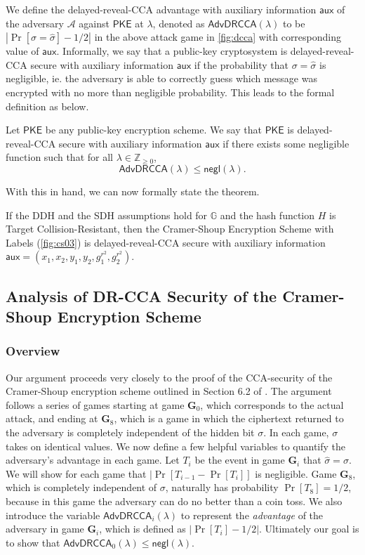 \documentclass[10pt,a4paper]{article}
\newcommand{\adv}{\mathcal{A}}
\newcommand{\PKE}{\mathsf{PKE}}
\newcommand{\negl}{\mathsf{negl}}
\newcommand{\aux}{\mathsf{aux}}
\newcommand{\drcca}{\mathsf{AdvDRCCA}}
\newcommand{\game}{\mathbf{G}}
\newcommand{\Z}{\mathbb{Z}}
\begin{document}
	We define the delayed-reveal-CCA advantage with auxiliary information $\aux$ of the adversary $\adv$ against $\PKE$ at $\lambda$, denoted as $\drcca(\lambda)$ to be $|\Pr[\sigma = \hat{\sigma}] - 1/2|$ in the above attack game in \cref{fig:dcca} with corresponding value of $\aux$. Informally, we say that a public-key cryptosystem is delayed-reveal-CCA secure with auxiliary information $\aux$ if the probability that $\sigma = \hat{\sigma}$ is negligible, ie. the adversary is able to correctly guess which message was encrypted with no more than negligible probability. This leads to the formal definition as below.
	
	\begin{definition}
		Let $\PKE$ be any public-key encryption scheme. We say that $\PKE$ is delayed-reveal-CCA secure with auxiliary information $\aux$ if there exists some negligible function such that for all $\lambda\in\Z_{\geq 0}$, $$\drcca(\lambda)\leq\negl(\lambda).$$
	\end{definition}

	With this in hand, we can now formally state the theorem.

	\begin{theorem}
		\label{thm:drcca-cs}
		If the DDH and the SDH assumptions hold for $\mathbb{G}$ and the hash function $H$ is Target Collision-Resistant, then the Cramer-Shoup Encryption Scheme with Labels (\cref{fig:cs03}) is delayed-reveal-CCA secure with auxiliary information $\aux = (x_1,x_2,y_1,y_2,g_1^{r^2},g_2^{r^2})$.
	\end{theorem}

	\subsection{Analysis of DR-CCA Security of the Cramer-Shoup Encryption Scheme}

	\subsubsection{Overview}

	Our argument proceeds very closely to the proof of the CCA-security of the Cramer-Shoup encryption scheme outlined in Section 6.2 of \cite{cs01}. The argument follows a series of games starting at game $\game_0$, which corresponds to the actual attack, and ending at $\game_8$, which is a game in which the ciphertext returned to the adversary is completely independent of the hidden bit $\sigma$. In each game, $\sigma$ takes on identical values. We now define a few helpful variables to quantify the adversary's advantage in each game. Let $T_i$ be the event in game $\game_i$ that $\hat{\sigma}=\sigma$. We will show for each game that $|\Pr[T_{i-1} - \Pr[T_i]]$ is negligible. Game $\game_8$, which is completely independent of $\sigma$, naturally has probability $\Pr[T_8]=1/2$, because in this game the adversary can do no better than a coin toss. We also introduce the variable $\drcca_i(\lambda)$ to represent the \textit{advantage} of the adversary in game $\game_i$, which is defined as $|\Pr[T_i]-1/2|$. Ultimately our goal is to show that $\drcca_0(\lambda)\leq\negl(\lambda)$.
	
\end{document}

